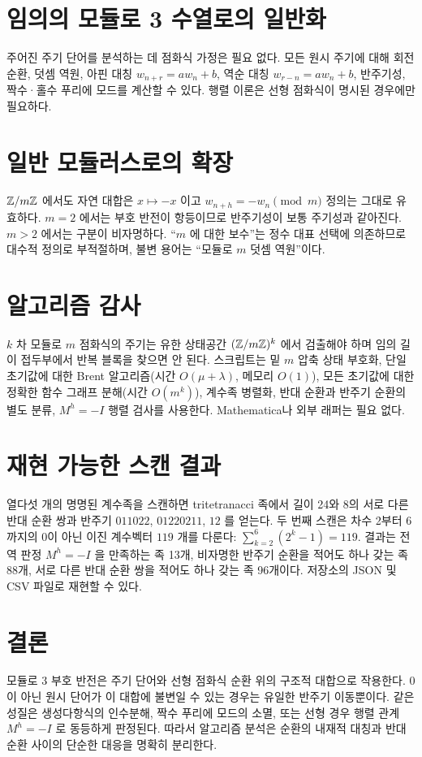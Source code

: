 \documentclass[11pt,a4paper]{article}
\begin{document}
\section{임의의 모듈로 3 수열로의 일반화}
주어진 주기 단어를 분석하는 데 점화식 가정은 필요 없다. 모든 원시 주기에 대해 회전 순환, 덧셈 역원, 아핀 대칭 \(w_{n+r}=aw_n+b\), 역순 대칭 \(w_{r-n}=aw_n+b\), 반주기성, 짝수·홀수 푸리에 모드를 계산할 수 있다. 행렬 이론은 선형 점화식이 명시된 경우에만 필요하다.
\section{일반 모듈러스로의 확장}
\(\mathbb Z/m\mathbb Z\) 에서도 자연 대합은 \(x\mapsto-x\) 이고 \(w_{n+h}=-w_n\pmod m\) 정의는 그대로 유효하다. \(m=2\) 에서는 부호 반전이 항등이므로 반주기성이 보통 주기성과 같아진다. \(m>2\) 에서는 구분이 비자명하다. “\(m\) 에 대한 보수”는 정수 대표 선택에 의존하므로 대수적 정의로 부적절하며, 불변 용어는 “모듈로 \(m\) 덧셈 역원”이다.
\section{알고리즘 감사}
\(k\) 차 모듈로 \(m\) 점화식의 주기는 유한 상태공간 \((\mathbb Z/m\mathbb Z)^k\) 에서 검출해야 하며 임의 길이 접두부에서 반복 블록을 찾으면 안 된다. 스크립트는 밑 \(m\) 압축 상태 부호화, 단일 초기값에 대한 Brent 알고리즘(시간 \(O(\mu+\lambda)\), 메모리 \(O(1)\)), 모든 초기값에 대한 정확한 함수 그래프 분해(시간 \(O(m^k)\)), 계수족 병렬화, 반대 순환과 반주기 순환의 별도 분류, \(M^h=-I\) 행렬 검사를 사용한다. Mathematica나 외부 래퍼는 필요 없다.
\section{재현 가능한 스캔 결과}
열다섯 개의 명명된 계수족을 스캔하면 tritetranacci 족에서 길이 24와 8의 서로 다른 반대 순환 쌍과 반주기 \(011022\), \(01220211\), \(12\) 를 얻는다. 두 번째 스캔은 차수 2부터 6까지의 0이 아닌 이진 계수벡터 \(119\) 개를 다룬다: \(\sum_{k=2}^{6}(2^k-1)=119\). 결과는 전역 판정 \(M^h=-I\) 을 만족하는 족 13개, 비자명한 반주기 순환을 적어도 하나 갖는 족 88개, 서로 다른 반대 순환 쌍을 적어도 하나 갖는 족 96개이다. 저장소의 JSON 및 CSV 파일로 재현할 수 있다.
\section*{결론}
모듈로 3 부호 반전은 주기 단어와 선형 점화식 순환 위의 구조적 대합으로 작용한다. 0이 아닌 원시 단어가 이 대합에 불변일 수 있는 경우는 유일한 반주기 이동뿐이다. 같은 성질은 생성다항식의 인수분해, 짝수 푸리에 모드의 소멸, 또는 선형 경우 행렬 관계 \(M^h=-I\) 로 동등하게 판정된다. 따라서 알고리즘 분석은 순환의 내재적 대칭과 반대 순환 사이의 단순한 대응을 명확히 분리한다.
\end{document}
